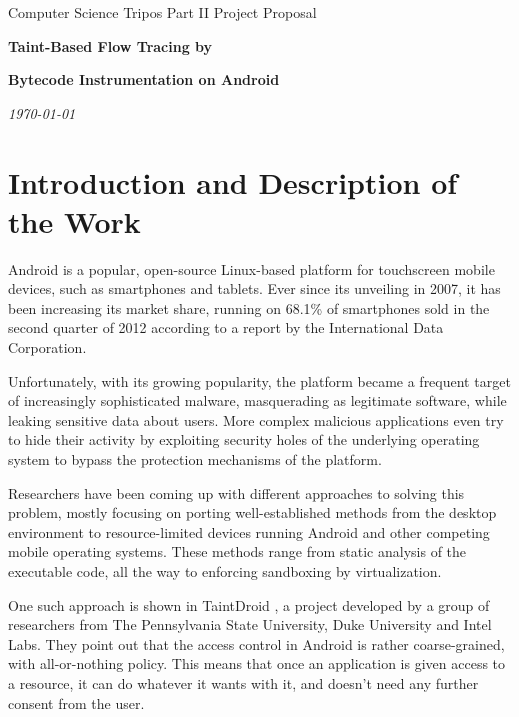 \documentclass[12pt]{article}
\begin{document}
\thispagestyle{empty}

\medskip
{}
\medskip
{}

\vspace{0.3in}
\centerline{\large Computer Science Tripos Part II Project Proposal}
\vspace{0.4in}
\centerline{\Large\bf Taint-Based Flow Tracing by}
\vspace{0.1in}
\centerline{\Large\bf Bytecode Instrumentation on Android}
\vspace{0.3in}
\cleanlookdateon
\centerline{\large \emph \today}
\vspace{0.5in}

\section*{Introduction and Description of the Work}

Android is a popular, open-source Linux-based platform for touchscreen
mobile devices, such as smartphones and tablets. Ever since its unveiling 
in 2007, it has been increasing its market share, running on 68.1\% of 
smartphones sold in the second quarter of 2012 according to a report by 
the International Data Corporation. 
\cite{www.idc.com/getdoc.jsp?containerId=prUS23638712}

Unfortunately, with its growing popularity, the platform became a frequent
target of increasingly sophisticated malware, masquerading as legitimate
software, while leaking sensitive data about users. More complex
malicious applications even try to hide their activity by exploiting 
security holes of the underlying operating system to bypass the 
protection mechanisms of the platform.

Researchers have been coming up with different approaches to solving
this problem, mostly focusing on porting well-established methods from
the desktop environment to resource-limited devices running Android and
other competing mobile operating systems. These methods range from 
static analysis of the executable code, all the way to enforcing sandboxing 
by virtualization. 

One such approach is shown in TaintDroid \cite{www.appanalysis.org}, 
a project developed by a group of researchers from The Pennsylvania State
University, Duke University and Intel Labs. They point out that the
access control in Android is rather coarse-grained, with all-or-nothing
policy. This means that once an application is given access to a resource,
it can do whatever it wants with it, and doesn't need any further consent 
from the user.
\end{document}
